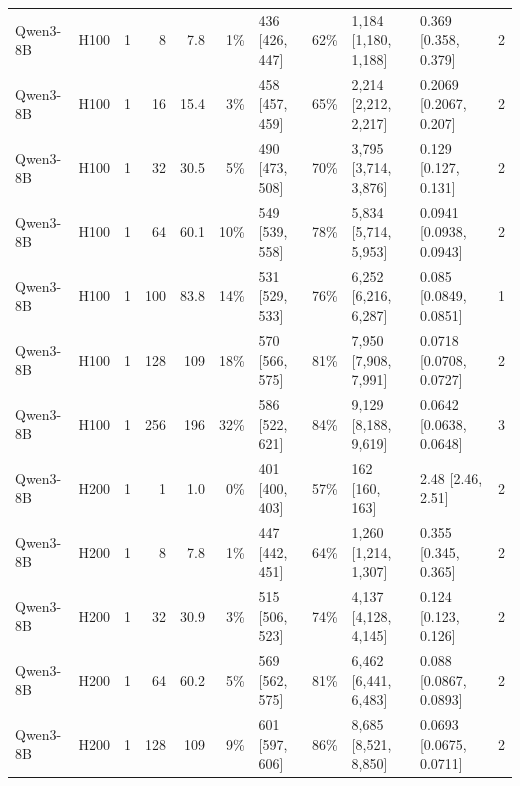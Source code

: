 \begin{landscape}
\begin{longtable}{llrrrrlrllr}
Qwen3-8B & H100 & 1 & 8 & 7.8 & 1\% & 436 {[}426, 447{]} & 62\% & 1,184 {[}1,180, 1,188{]} & 0.369 {[}0.358, 0.379{]} & 2 \\
Qwen3-8B & H100 & 1 & 16 & 15.4 & 3\% & 458 {[}457, 459{]} & 65\% & 2,214 {[}2,212, 2,217{]} & 0.2069 {[}0.2067, 0.207{]} & 2 \\
Qwen3-8B & H100 & 1 & 32 & 30.5 & 5\% & 490 {[}473, 508{]} & 70\% & 3,795 {[}3,714, 3,876{]} & 0.129 {[}0.127, 0.131{]} & 2 \\
Qwen3-8B & H100 & 1 & 64 & 60.1 & 10\% & 549 {[}539, 558{]} & 78\% & 5,834 {[}5,714, 5,953{]} & 0.0941 {[}0.0938, 0.0943{]} & 2 \\
Qwen3-8B & H100 & 1 & 100 & 83.8 & 14\% & 531 {[}529, 533{]} & 76\% & 6,252 {[}6,216, 6,287{]} & 0.085 {[}0.0849, 0.0851{]} & 1 \\
Qwen3-8B & H100 & 1 & 128 & 109 & 18\% & 570 {[}566, 575{]} & 81\% & 7,950 {[}7,908, 7,991{]} & 0.0718 {[}0.0708, 0.0727{]} & 2 \\
Qwen3-8B & H100 & 1 & 256 & 196 & 32\% & 586 {[}522, 621{]} & 84\% & 9,129 {[}8,188, 9,619{]} & 0.0642 {[}0.0638, 0.0648{]} & 3 \\
Qwen3-8B & H200 & 1 & 1 & 1.0 & 0\% & 401 {[}400, 403{]} & 57\% & 162 {[}160, 163{]} & 2.48 {[}2.46, 2.51{]} & 2 \\
Qwen3-8B & H200 & 1 & 8 & 7.8 & 1\% & 447 {[}442, 451{]} & 64\% & 1,260 {[}1,214, 1,307{]} & 0.355 {[}0.345, 0.365{]} & 2 \\
Qwen3-8B & H200 & 1 & 32 & 30.9 & 3\% & 515 {[}506, 523{]} & 74\% & 4,137 {[}4,128, 4,145{]} & 0.124 {[}0.123, 0.126{]} & 2 \\
Qwen3-8B & H200 & 1 & 64 & 60.2 & 5\% & 569 {[}562, 575{]} & 81\% & 6,462 {[}6,441, 6,483{]} & 0.088 {[}0.0867, 0.0893{]} & 2 \\
Qwen3-8B & H200 & 1 & 128 & 109 & 9\% & 601 {[}597, 606{]} & 86\% & 8,685 {[}8,521, 8,850{]} & 0.0693 {[}0.0675, 0.0711{]} & 2 \\
\end{longtable}
\endgroup
\end{landscape}
\restoregeometry
